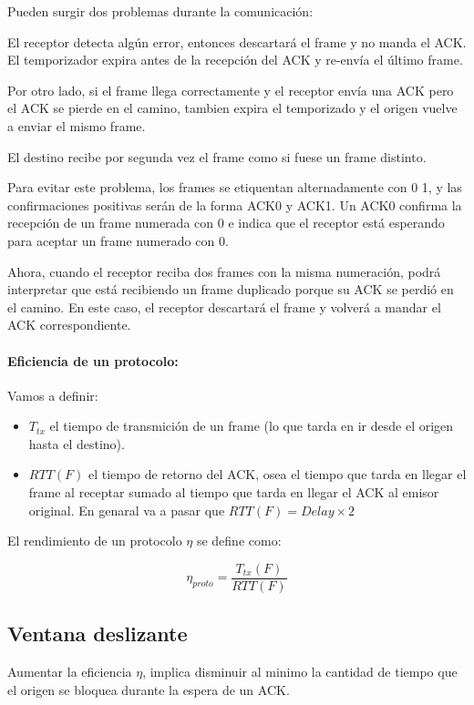 Pueden surgir dos problemas durante la comunicación:
  
El receptor detecta algún error, entonces descartará el frame y no manda el ACK. El temporizador expira antes de la recepción del ACK y re-envía el último frame.

Por otro lado, si el frame llega correctamente y el receptor envía una ACK pero el ACK se pierde en el camino, tambien expira el temporizado y el origen vuelve a enviar el mismo frame. 
  
El destino recibe por segunda vez el frame como si fuese un frame distinto.

Para evitar este problema, los frames se etiquentan alternadamente con 0  1, y las confirmaciones positivas serán de la forma ACK0 y ACK1. Un ACK0 confirma la recepción de un frame numerada con 0 e indica que el receptor está esperando para aceptar un frame numerado con 0.

Ahora, cuando el receptor reciba dos frames con la misma numeración, podrá interpretar que está recibiendo un frame duplicado porque su ACK se perdió en el camino. En este caso, el receptor descartará el frame y volverá a mandar el ACK correspondiente.

\paragraph{Eficiencia de un protocolo:} 
Vamos a definir:
\begin{itemize}
  \item \(T_{tx}\) el tiempo de transmición de un frame (lo que tarda en ir desde el origen hasta el destino).
  \item \(RTT(F)\) el tiempo de retorno del ACK, osea el tiempo que tarda en llegar el frame al receptar sumado al tiempo que tarda en llegar el ACK al emisor original. En genaral va a pasar que \(RTT(F) = Delay\times 2\) 
\end{itemize}

El rendimiento de un protocolo \(\eta\) se define como:

\[\eta_{proto} = \frac{T_{tx}(F)}{RTT(F)}\]

\subsection{Ventana deslizante}\label{sec:ventana-deslizante}
Aumentar la eficiencia \(\eta\), implica disminuir al minimo la cantidad de tiempo que el origen se bloquea durante la espera de un ACK.

